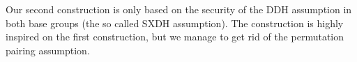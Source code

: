 Our second construction is only based on the security of the DDH assumption in both base groups (the so called SXDH assumption). The construction is highly inspired on the first construction, but we manage to get rid of the permutation pairing assumption. 

 


%
%
